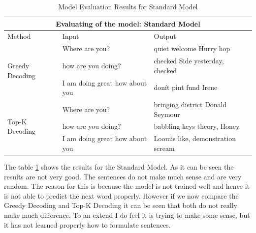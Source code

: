 \documentclass[a4paper]{article}
\begin{document}
\begin{itemize}
          \begin{table}[H]
              \centering
              \begin{tabular}{|l|l|l|}
                  \hline
                  \multicolumn{3}{|c|}{Evaluating of the model: Standard Model}                                         \\
                  \hline
                  Method                           & Input                          & Output                            \\
                  \hline
                  \multirow{3}{*}{Greedy Decoding} & Where are you?                 & quiet welcome Hurry hop           \\
                                                   & how are you doing?             & checked Side yesterday, checked   \\
                                                   & I am doing great how about you & donít pint fund Irene             \\
                  \hline
                  \multirow{3}{*}{Top-K Decoding}  & Where are you?                 & bringing district Donald Seymour  \\
                                                   & how are you doing?             & babbling keys theory, Honey       \\
                                                   & I am doing great how about you & Loomis like, demonstration scream \\
                  \hline
              \end{tabular}
              \caption{Model Evaluation Results for Standard Model}
              \label{tab:standard_model_results}
          \end{table}

          The table \ref{tab:standard_model_results} shows the results for the Standard Model. As it can be seen the results are not very good. The sentences do not make much sense and are very random. The reason for this is because the model is not trained well and hence it is not able to predict the next word properly. However if we now compare the Greedy Decoding and Top-K Decoding it can be seen that both do not really make much difference. To an extend I do feel it is trying to make some sense, but it has not learned properly how to formulate sentences.


\end{itemize}
\end{document}
